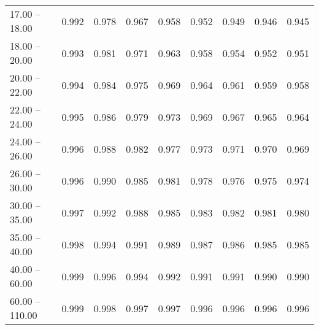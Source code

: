 \begin{table}[htp]
\begin{tiny}
\begin{center}
\begin{tabular}{|l|c|c|c|c|c|c|c|c|}
      17.00 -- 18.00 &  0.992 & 0.978 & 0.967 & 0.958 & 0.952 & 0.949 & 0.946 & 0.945 \\ 
      18.00 -- 20.00 &  0.993 & 0.981 & 0.971 & 0.963 & 0.958 & 0.954 & 0.952 & 0.951 \\ 
      20.00 -- 22.00 &  0.994 & 0.984 & 0.975 & 0.969 & 0.964 & 0.961 & 0.959 & 0.958 \\ 
      22.00 -- 24.00 &  0.995 & 0.986 & 0.979 & 0.973 & 0.969 & 0.967 & 0.965 & 0.964 \\ 
      24.00 -- 26.00 &  0.996 & 0.988 & 0.982 & 0.977 & 0.973 & 0.971 & 0.970 & 0.969 \\ 
      26.00 -- 30.00 &  0.996 & 0.990 & 0.985 & 0.981 & 0.978 & 0.976 & 0.975 & 0.974 \\ 
      30.00 -- 35.00 &  0.997 & 0.992 & 0.988 & 0.985 & 0.983 & 0.982 & 0.981 & 0.980 \\ 
      35.00 -- 40.00 &  0.998 & 0.994 & 0.991 & 0.989 & 0.987 & 0.986 & 0.985 & 0.985 \\ 
      40.00 -- 60.00 &  0.999 & 0.996 & 0.994 & 0.992 & 0.991 & 0.991 & 0.990 & 0.990 \\ 
      60.00 -- 110.00 &  0.999 & 0.998 & 0.997 & 0.997 & 0.996 & 0.996 & 0.996 & 0.996 \\ 
\hline
\end{tabular} 
             \end{center} 
             \end{tiny} 
             \label{tab:sa_offN_jpsi8} 
             \end{table}


